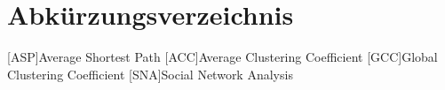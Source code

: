 \chapter*{Abkürzungsverzeichnis}
\begin{acronym}
    [ASP]{Average Shortest Path}
    [ACC]{Average Clustering Coefficient}
    [GCC]{Global Clustering Coefficient}
    [SNA]{Social Network Analysis}
\end{acronym}
